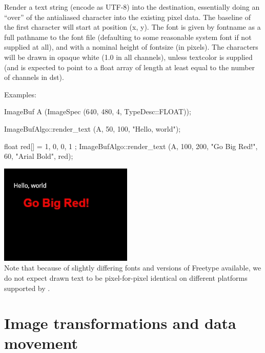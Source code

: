  
Render a text string (encode as UTF-8) into the destination, essentially
doing an ``over'' of the antialiased character into the existing pixel data.
The baseline of the first character will start at position ({\cf x, y}).
The font is given by {\cf fontname} as a full pathname to the font file
(defaulting to some reasonable system font if not supplied at all), and with
a nominal height of {\cf fontsize} (in pixels).  The characters will be
drawn in opaque white (1.0 in all channels), unless {\cf textcolor} is
supplied (and is expected to point to a {\cf float} array of length at least
equal to the number of channels in {\cf dst}).

\smallskip
\noindent Examples:
\begin{code}
    ImageBuf A (ImageSpec (640, 480, 4, TypeDesc::FLOAT));

    ImageBufAlgo::render_text (A, 50, 100, "Hello, world");

    float red[] = { 1, 0, 0, 1 };
    ImageBufAlgo::render_text (A, 100, 200, "Go Big Red!",
                               60, "Arial Bold", red);
\end{code}
\spc \includegraphics[width=2.5in]{figures/text.jpg}  \\

\noindent Note that because of slightly differing fonts and versions of
Freetype available, we do not expect drawn text to be pixel-for-pixel 
identical on different platforms supported by \product.
\apiend





\section{Image transformations and data movement}
\label{sec:iba:transforms}

